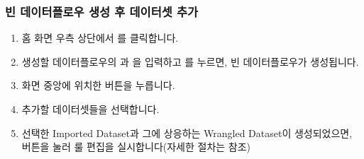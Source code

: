 \documentclass[letterpaper,10pt,english]{sphinxmanual}
\begin{document}
\subsubsection{빈 데이터플로우 생성 후 데이터셋 추가}
\label{\detokenize{discovery/part07/add_datasets:dataflow-creation-first}}\label{\detokenize{discovery/part07/add_datasets:id2}}\begin{enumerate}
\def\theenumi{\arabic{enumi}}
\def\labelenumi{\theenumi .}
\makeatletter\def\p@enumii{\p@enumi \theenumi .}\makeatother
\item {} 
 홈 화면 우측 상단에서 를 클릭합니다.

\item {} 
생성할 데이터플로우의 과 을 입력하고 를 누르면, 빈 데이터플로우가 생성됩니다.
\begin{quote}

\begin{figure}[H]
\centering

\noindent{}
\end{figure}
\end{quote}

\item {} 
화면 중앙에 위치한  버튼을 누릅니다.
\begin{quote}

\begin{figure}[H]
\centering

\noindent{}
\end{figure}
\end{quote}

\item {} 
추가할 데이터셋들을 선택합니다.
\begin{quote}

\begin{figure}[H]
\centering

\noindent{}
\end{figure}
\end{quote}

\item {} 
선택한 Imported Dataset과 그에 상응하는 Wrangled Dataset이 생성되었으면,  버튼을 눌러 룰 편집을 실시합니다(자세한 절차는 {\hyperref[\detokenize{discovery/part07/edit_rules::doc}]{}} 참조)
\begin{quote}

\begin{figure}[H]
\centering

\noindent{}
\end{figure}
\end{quote}

\end{enumerate}
\end{document}
